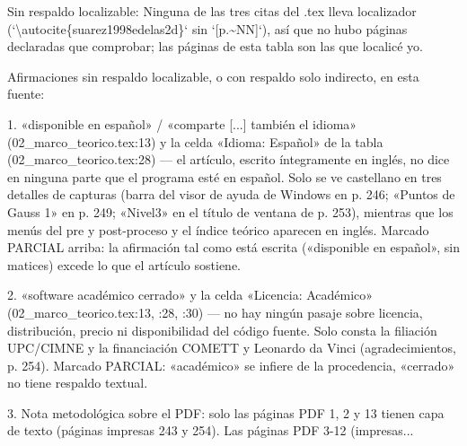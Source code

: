 \documentclass[11pt,a4paper]{article}
\newcommand{\campo}[1]{\textcolor{gris}{\footnotesize #1}}
\begin{document}
{\small\campo{Sin respaldo localizable:} Ninguna de las tres citas del .tex lleva localizador (`\textbackslash{}autocite\{suarez1998edelas2d\}` sin `[p.\textasciitilde{}NN]`), así que no hubo páginas declaradas que comprobar; las páginas de esta tabla son las que localicé yo.

Afirmaciones sin respaldo localizable, o con respaldo solo indirecto, en esta fuente:

1. «disponible en español» / «comparte [...] también el idioma» (02\_marco\_teorico.tex:13) y la celda «Idioma: Español» de la tabla (02\_marco\_teorico.tex:28) --- el artículo, escrito íntegramente en inglés, no dice en ninguna parte que el programa esté en español. Solo se ve castellano en tres detalles de capturas (barra del visor de ayuda de Windows en p. 246; «Puntos de Gauss 1» en p. 249; «Nivel3» en el título de ventana de p. 253), mientras que los menús del pre y post-proceso y el índice teórico aparecen en inglés. Marcado PARCIAL arriba: la afirmación tal como está escrita («disponible en español», sin matices) excede lo que el artículo sostiene.

2. «software académico cerrado» y la celda «Licencia: Académico» (02\_marco\_teorico.tex:13, :28, :30) --- no hay ningún pasaje sobre licencia, distribución, precio ni disponibilidad del código fuente. Solo consta la filiación UPC/CIMNE y la financiación COMETT y Leonardo da Vinci (agradecimientos, p. 254). Marcado PARCIAL: «académico» se infiere de la procedencia, «cerrado» no tiene respaldo textual.

3. Nota metodológica sobre el PDF: solo las páginas PDF 1, 2 y 13 tienen capa de texto (páginas impresas 243 y 254). Las páginas PDF 3-12 (impresas...\par}
\end{document}
